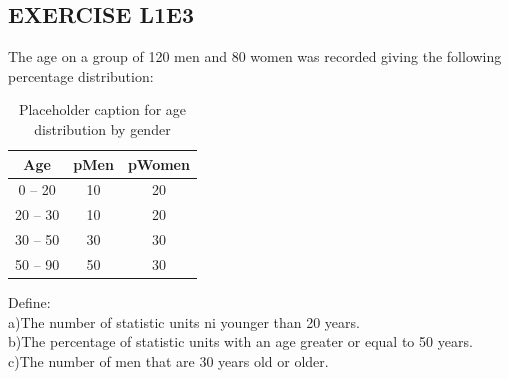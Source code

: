 \documentclass[12pt,a4paper]{article}
\begin{document}
\subsection{EXERCISE L1E3}
The age on a group of 120 men and 80 women was recorded giving the following percentage distribution:\\
\begin{table}[h]
    \centering
    \begin{tabular}{ccc}
        \hline
        \textbf{Age} & \textbf{pMen} & \textbf{pWomen} \\
        \hline
        0 -- 20 & 10 & 20 \\
        20 -- 30 & 10 & 20 \\
        30 -- 50 & 30 & 30 \\
        50 -- 90 & 50 & 30 \\
        \hline
    \end{tabular}
    \caption{Placeholder caption for age distribution by gender}
    \label{tab:age_distribution}
\end{table}

Define:\\
a)The number of statistic units ni younger than 20 years.\\
b)The percentage of statistic units with an age greater or equal to 50 years.\\
c)The number of men that are 30 years old or older.\\
\end{document}
